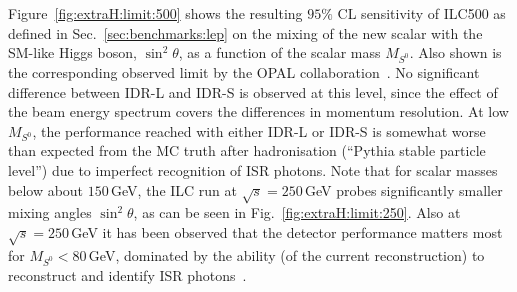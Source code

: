 % 

Figure~\ref{fig:extraH:limit:500} shows the resulting $95\%$ CL sensitivity of ILC500 as defined in Sec.~\ref{sec:benchmarks:lep} on the mixing of the new scalar with the SM-like Higgs boson, $\sin^2{\theta}$, as a function of the scalar mass $M_{S^0}$. Also shown is the corresponding observed limit by the OPAL collaboration~\cite{Abbiendi:2002qp}. No significant difference between IDR-L and IDR-S is observed at this level, since the effect of the beam energy spectrum covers the differences in momentum resolution. At low $M_{S^0}$, the performance reached with either IDR-L or IDR-S is somewhat worse than expected from the MC truth after hadronisation (``Pythia stable particle level'') due to imperfect recognition of ISR photons. Note that for scalar masses below about $150$\,GeV, the ILC run at $\sqrt{s}=250$\,GeV probes significantly smaller mixing angles $\sin^2{\theta}$, as can be seen in Fig.~\ref{fig:extraH:limit:250}. Also at $\sqrt{s}=250$\,GeV it has been observed that the detector performance matters most for $M_{S^0}<80$\,GeV, dominated by the ability (of the current reconstruction) to reconstruct and identify ISR photons~\cite{FIPnote:ESU_BSM}.

